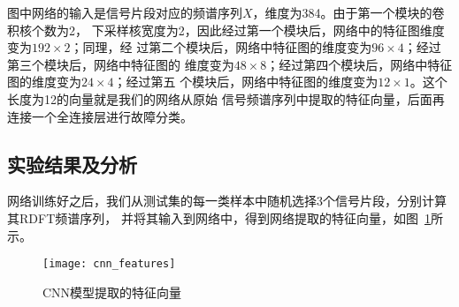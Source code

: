 图中网络的输入是信号片段对应的频谱序列$X$，维度为384。由于第一个模块的卷积核个数为2，
下采样核宽度为2，因此经过第一个模块后，网络中的特征图维度变为$192\times 2$；同理，经
过第二个模块后，网络中特征图的维度变为$96\times 4$；经过第三个模块后，网络中特征图的
维度变为$48\times 8$；经过第四个模块后，网络中特征图的维度变为$24\times 4$；经过第五
个模块后，网络中特征图的维度变为$12\times 1$。这个长度为12的向量就是我们的网络从原始
信号频谱序列中提取的特征向量，后面再连接一个全连接层进行故障分类。

\subsection{实验结果及分析}

网络训练好之后，我们从测试集的每一类样本中随机选择3个信号片段，分别计算其RDFT频谱序列，
并将其输入到网络中，得到网络提取的特征向量，如图~\ref{fig:cnn_features}所示。
\begin{figure}[ht]
  \centering%
  \texttt{[image: cnn\_features]}
  \caption{CNN模型提取的特征向量}
  \label{fig:cnn_features}
\end{figure}

